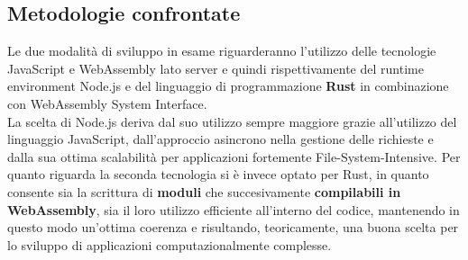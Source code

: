 \subsection{Metodologie confrontate}
Le due modalità di sviluppo in esame riguarderanno l'utilizzo delle tecnologie JavaScript e WebAssembly lato server e quindi rispettivamente del runtime environment Node.js e del linguaggio di programmazione \textbf{Rust} in combinazione con WebAssembly System Interface\cite*{rust:wasm}. 
\\La scelta di Node.js deriva dal suo utilizzo sempre maggiore grazie all'utilizzo del linguaggio JavaScript, dall'approccio asincrono nella gestione delle richieste e dalla sua ottima scalabilità per applicazioni fortemente File-System-Intensive.
Per quanto riguarda la seconda tecnologia si è invece optato per Rust, in quanto consente sia la scrittura di \textbf{moduli} che succesivamente \textbf{compilabili in WebAssembly}, sia il loro utilizzo efficiente all'interno del codice, mantenendo in questo modo un'ottima coerenza e risultando, teoricamente, una buona scelta per lo sviluppo di applicazioni computazionalmente complesse. 

